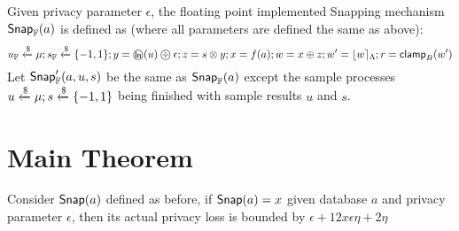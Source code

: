 \documentclass[a4paper,11pt]{article}
\begin{document}
\begin{defn}
Given privacy parameter $\epsilon$, the floating point implemented Snapping mechanism $\mathsf{Snap}_{\mathbb{F}}(a)$ is defined as (where all parameters are defined the same as above):
\[
	u_{\mathbb{F}} \xleftarrow{\$} \edistr; s_{\mathbb{F}} \samplel \{-1, 1\}; y = \oln (u) \odiv \epsilon; z = s \otimes y; x = f(a); w = x \oplus z; w' = \round{w}_{\Lambda}; r = \clamp_B (w')
\]
Let $\mathsf{Snap}_{\mathbb{F}}'(a, u, s)$ be the same as $\mathsf{Snap}_{\mathbb{F}}(a)$ except the sample processes $u \xleftarrow{\$} \mu; s \xleftarrow{\$} \{-1, 1\}$ being finished with sample results $u$ and $s$.
\end{defn}




\section{Main Theorem}

\begin{thm}
Consider $\mathsf{Snap}(a)$ defined as before, if $\mathsf{Snap}(a) = x$ given database $a$ and privacy parameter $\epsilon$, then its actual privacy loss is bounded by $\epsilon + 12 x \epsilon \eta + 2\eta$
\end{thm}
\end{document}
